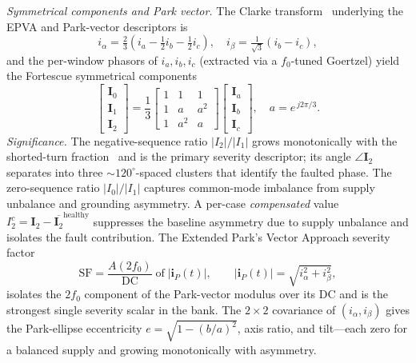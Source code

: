 \documentclass[journal]{IEEEtran}
\begin{document}
\emph{Symmetrical components and Park vector.} The Clarke transform~\cite{cardoso2001}
underlying the EPVA and Park-vector descriptors is
\begin{equation}
i_\alpha=\tfrac{2}{3}\!\left(i_a-\tfrac{1}{2}i_b-\tfrac{1}{2}i_c\right),\quad
i_\beta=\tfrac{1}{\sqrt{3}}\left(i_b-i_c\right),
\end{equation}
and the per-window phasors of $i_a, i_b, i_c$ (extracted via a $f_0$-tuned Goertzel)
yield the Fortescue symmetrical components
\begin{equation}
\begin{bmatrix}\mathbf{I}_0\\\mathbf{I}_1\\\mathbf{I}_2\end{bmatrix}
=\frac{1}{3}\begin{bmatrix}1&1&1\\ 1&a&a^{2}\\ 1&a^{2}&a\end{bmatrix}
\begin{bmatrix}\mathbf{I}_a\\\mathbf{I}_b\\\mathbf{I}_c\end{bmatrix},\quad a=e^{\,j2\pi/3}.
\end{equation}
\emph{Significance.} The negative-sequence ratio $|I_2|/|I_1|$ grows monotonically with the
shorted-turn fraction~\cite{cardoso2001,garcia2024,ruzimov2025} and is the primary severity
descriptor; its angle $\angle\mathbf{I}_2$ separates into three $\sim$$120^{\circ}$-spaced
clusters that identify the faulted phase. The zero-sequence ratio $|I_0|/|I_1|$ captures
common-mode imbalance from supply unbalance and grounding asymmetry. A per-case
\emph{compensated} value $I_2^c = \mathbf{I}_2 - \overline{\mathbf{I}_2}^{\text{healthy}}$
suppresses the baseline asymmetry due to supply unbalance and isolates the fault
contribution. The Extended Park's Vector Approach severity factor~\cite{cardoso2001}
\begin{equation}
\mathrm{SF}=\frac{A(2f_0)}{\mathrm{DC}}\;\text{of}\;|\mathbf{i}_P(t)|, \qquad
|\mathbf{i}_P(t)|=\sqrt{i_\alpha^2+i_\beta^2},
\end{equation}
isolates the $2f_0$ component of the Park-vector modulus over its DC and is the strongest
single severity scalar in the bank. The $2{\times}2$ covariance of $(i_\alpha,i_\beta)$
gives the Park-ellipse eccentricity $e=\sqrt{1-(b/a)^2}$, axis ratio, and tilt---each
zero for a balanced supply and growing monotonically with asymmetry.
\end{document}
